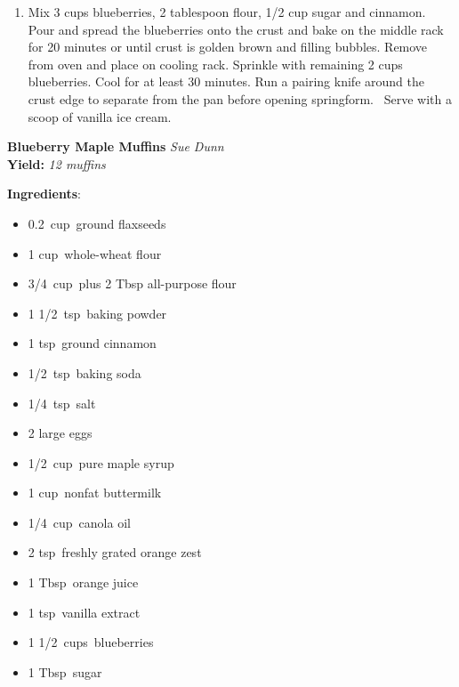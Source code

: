 \documentclass[11pt, twoside, openany]{book}
\begin{document}
\begin{minipage}[t]{\linewidth}
\begin{enumerate}
\item Mix 3 cups blueberries, 2 tablespoon flour, 1/2 cup sugar and cinnamon. Pour and spread the blueberries onto the crust and bake on the middle rack for 20 minutes or until crust is golden brown and filling bubbles. Remove from oven and place on cooling rack. Sprinkle with remaining 2 cups blueberries. Cool for at least 30 minutes. Run a pairing knife around the crust edge to separate from the pan before opening springform.  Serve with a scoop of vanilla ice cream.
\end{enumerate}
\end{minipage}\vspace{8mm}
\noindent\begin{minipage}[t]{\linewidth}%
{\Large\textbf{Blueberry Maple Muffins}} \label{blueberry-maple-muffins}\hfill\textit{Sue Dunn}\\
\textbf{Yield:} \textit{12 muffins}\\
\noindent\begin{minipage}[t]{0.78\linewidth}%
\textbf{Ingredients}:\vspace{-3mm}
\begin{multicols}{2}
\begin{itemize}\setlength\itemsep{-1mm}
\item 0.2 cup ground flaxseeds
\item 1 cup whole-wheat flour
\item 3/4 cup plus 2 Tbsp all-purpose flour
\item 1 1/2 tsp baking powder
\item 1 tsp ground cinnamon
\item 1/2 tsp baking soda
\item 1/4 tsp salt
\item 2 large eggs
\item 1/2 cup pure maple syrup
\item 1 cup nonfat buttermilk
\item 1/4 cup canola oil
\item 2 tsp freshly grated orange zest
\item 1 Tbsp orange juice
\item 1 tsp vanilla extract
\item 1 1/2 cups blueberries
\item 1 Tbsp sugar
\end{itemize}
\end{multicols}
\end{minipage}
\noindent\begin{minipage}[t]{0.18\linewidth}

\end{minipage}
\end{minipage}
\end{document}
